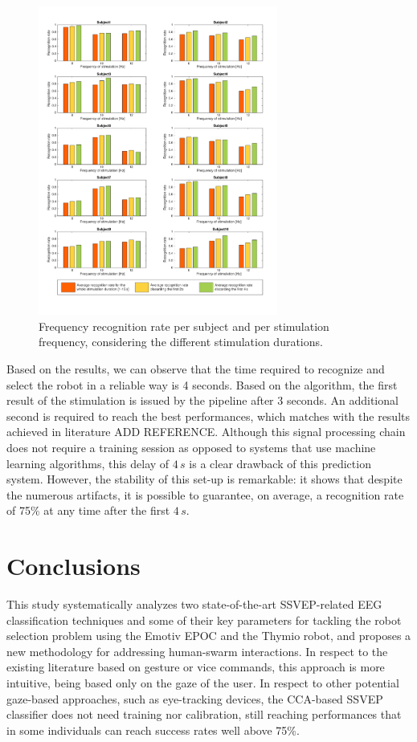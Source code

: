 \documentclass{svmult}
\begin{document}
\begin{figure}
\center
\includegraphics[width=0.7\textwidth]{figures/all-results-reconn.pdf}
\caption{Frequency recognition rate per subject and per stimulation frequency, considering the different stimulation durations.}
\label{fig:all-results-reconn}
\end{figure}

Based on the results, we can observe that the time required to recognize and select the robot in a reliable way is 4 seconds. 
Based on the algorithm, the first result of the stimulation is issued by the pipeline after 3 seconds. 
An additional second is required to reach the best performances, which matches with the results achieved in literature ADD REFERENCE. 
Although this signal processing chain does not require a training session as opposed to systems that use machine learning algorithms, this delay of $4\,s$ is a clear drawback of this prediction system. 
However, the stability of this set-up is remarkable: it shows that despite the numerous artifacts, it is possible to guarantee, on average, a recognition rate of 75\% at any time after the first $4\,s$. 

\section{Conclusions}
This study systematically analyzes two state-of-the-art SSVEP-related EEG classification techniques and some of their key parameters for tackling the robot selection problem using the Emotiv EPOC and the Thymio robot, and proposes a new methodology for addressing human-swarm interactions. 
In respect to the existing literature based on gesture or vice commands, this approach is more intuitive, being based only on the gaze of the user. 
In respect to other potential gaze-based approaches, such as eye-tracking devices, the CCA-based SSVEP classifier does not need training nor calibration, still reaching performances that in some individuals can reach success rates well above 75\%.
\end{document}
